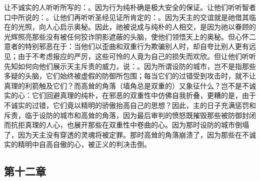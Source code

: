 让不诚实的人听听所写的：。因为行为纯朴确是极大安全的保证。让他们听听智者口中所说的：。让他们再听听圣经见证所肯定的：。因为天主的交谊就是祂借其临在的光照，向人心启示奥秘。因此，祂被说成与纯朴的人相交，是因为祂以眷顾的光辉照亮那些没有被任何狡诈阴影遮蔽的头脑，使他们领悟天上的奥秘。但心怀二意者的特别邪恶在于：当他们以歪曲和双重行为欺骗别人时，却自夸比别人更有远见；由于不考虑报应的严厉，这些可怜的人竟为自己的损失而欢欣。但让他们听听先知如何向他们展示天主斥责的威力，说：。因为所谓设防的城市，岂不是指那些多疑的头脑，它们始终被虚假的防御所包围；每当它们的过错受到攻击时，就不让真理的利箭触及它们？而高耸的角落（墙角总是双重的）又象征什么？岂不是不诚实的心：它们回避真理的纯朴，在邪恶的双重性中仿佛自我折叠，更糟的是，由于不诚实的过错，它们竟以精明的骄傲抬高自己的思想？因此，主的日子充满惩罚和斥责，临于设防的城市和高耸的角落，因为最后审判的愤怒既摧毁那些被防御封闭而抗拒真理的人心，也展开那些在双重性中卷曲的心。因为那时设防的城市倒塌了，因为天主没有穿透的灵魂将被定罪。那时高耸的角落崩溃了，因为那些在不诚实的精明中自高自傲的心，被正义的判决击倒。\par


\subsection{第十二章}

\par

